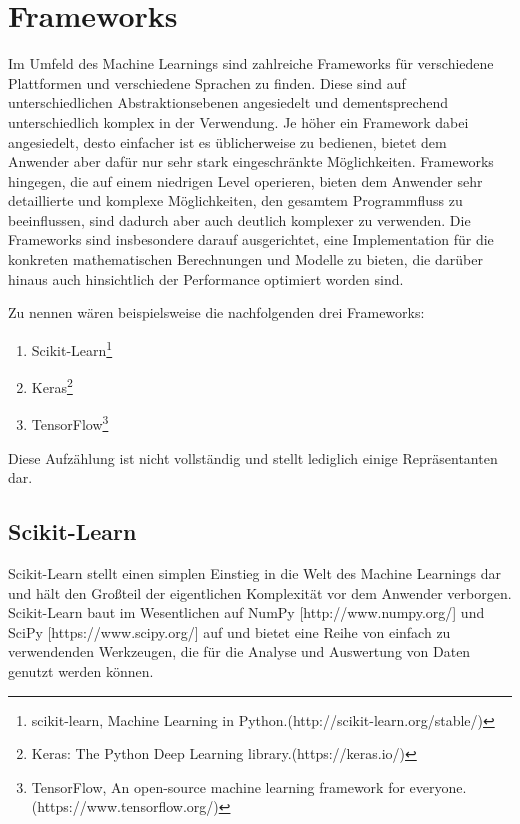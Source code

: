 \section{Frameworks}

Im Umfeld des Machine Learnings sind zahlreiche Frameworks für verschiedene Plattformen und verschiedene Sprachen zu
finden. Diese sind auf unterschiedlichen Abstraktionsebenen angesiedelt und dementsprechend unterschiedlich komplex
in der Verwendung.
Je höher ein Framework dabei angesiedelt, desto einfacher ist es üblicherweise zu bedienen, bietet dem Anwender aber
dafür nur sehr stark eingeschränkte Möglichkeiten. Frameworks hingegen, die auf einem niedrigen Level operieren, bieten
dem Anwender sehr detaillierte und komplexe Möglichkeiten, den gesamtem Programmfluss zu beeinflussen, sind dadurch aber
auch deutlich komplexer zu verwenden.
Die Frameworks sind insbesondere darauf ausgerichtet, eine Implementation für die konkreten mathematischen Berechnungen
und Modelle zu bieten, die darüber hinaus auch hinsichtlich der Performance optimiert worden sind.

Zu nennen wären beispielsweise die nachfolgenden drei Frameworks:

\begin{enumerate}
    \item{Scikit-Learn\footnote{scikit-learn, Machine Learning in Python.\newline(http://scikit-learn.org/stable/)}}
    \item{Keras\footnote{Keras: The Python Deep Learning library.\newline(https://keras.io/)}}
    \item{TensorFlow\footnote{TensorFlow\texttrademark, An open-source machine learning framework for everyone.\newline(https://www.tensorflow.org/)}}
\end{enumerate}

Diese Aufzählung ist nicht vollständig und stellt lediglich einige Repräsentanten dar.

\subsection{Scikit-Learn}

Scikit-Learn stellt einen simplen Einstieg in die Welt des Machine Learnings dar und hält den Großteil der eigentlichen
Komplexität vor dem Anwender verborgen. Scikit-Learn baut im Wesentlichen auf NumPy [http://www.numpy.org/] und
SciPy [https://www.scipy.org/] auf und bietet eine Reihe von einfach zu verwendenden Werkzeugen, die für die Analyse und
Auswertung von Daten genutzt werden können.

